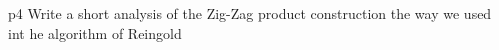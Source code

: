 \documentclass[a4paper, 11pt]{article}
\begin{document}
\pagebreak


\begin{problem}{%
	}{p4%
	}
	Write a short analysis of the Zig-Zag product construction the way we used int he algorithm of Reingold
\end{problem}
\end{document}
